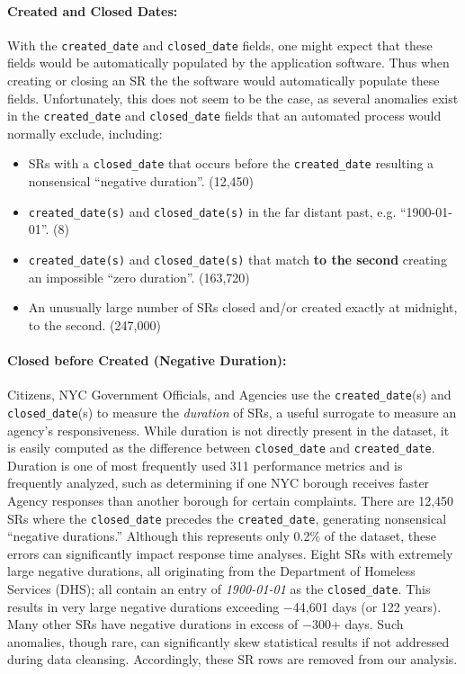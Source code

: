\documentclass[linenumber]{jdsart}
\begin{document}
\paragraph{Created and Closed Dates:}
\label{sec:negativeduration}
With the \texttt{created\_date} and \texttt{closed\_date} fields, one 
might expect that these fields would be automatically populated by the  
application software. Thus when creating  or closing an SR 
the the software would automatically populate these fields. 
Unfortunately, this does not seem to be the case, as several anomalies 
exist in the \texttt{created\_date} and \texttt{closed\_date} fields that
an automated process would normally exclude, including:

\begin{itemize}[left=1.5em]
    \item SRs with a \texttt{closed\_date} that occurs before the 
    \texttt{created\_date} resulting a nonsensical ``negative duration''. (12,450)
    \item \texttt{created\_date(s)} and \texttt{closed\_date(s)} in 
    the far distant past, e.g. ``1900-01-01''. (8)
    \item \texttt{created\_date(s)} and \texttt{closed\_date(s)} that 
    match \textbf{to the second} creating an impossible ``zero duration''. (163,720)
    \item An unusually large number of SRs closed and/or created 
    exactly at midnight, to the second. (247,000)
\end{itemize}


\paragraph{Closed before Created (Negative Duration):}
Citizens, NYC Government Officials, and Agencies use the \texttt{created\_date}(s) and 
\texttt{closed\_date}(s) to measure the \textit{duration} of SRs, 
a useful surrogate to measure an agency's responsiveness. 
While duration is not directly present in the dataset, 
it is easily computed as the difference between
\texttt{closed\_date} and \texttt{created\_date}.  Duration is one of 
most frequently used 311 performance metrics 
and is frequently analyzed, such as determining if 
one NYC borough receives faster Agency responses than 
another borough for certain complaints. There are 
12,450 SRs where the \texttt{closed\_date} precedes the 
\texttt{created\_date}, generating nonsensical ``negative durations.'' 
Although this represents only 0.2\% of the dataset, these errors can 
significantly impact response time analyses. Eight SRs with extremely 
large negative durations, all originating from the 
Department of Homeless Services (DHS); all contain an entry 
of \textit{1900-01-01} as the \texttt{closed\_date}. This results 
in very large negative durations exceeding $-$44,601 
days (or 122 years). Many other SRs have negative durations 
in excess of $-$300+ days. Such anomalies, though rare, can 
significantly skew statistical results if not addressed during 
data cleansing. Accordingly, these SR rows are removed from our analysis. 
\end{document}
